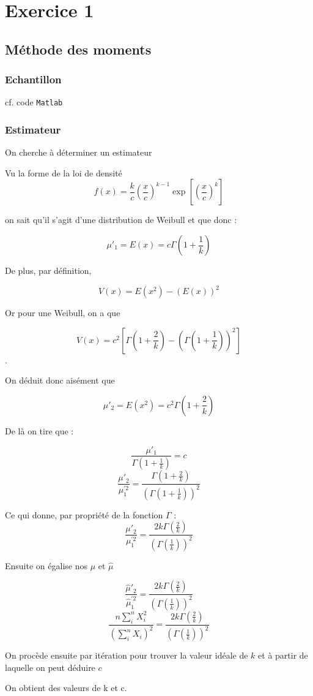 \section{Exercice 1 }

\subsection{Méthode des moments}

\subsubsection{Echantillon}
cf. code \texttt{Matlab}

\subsubsection{Estimateur}

On cherche à déterminer un estimateur 

Vu la forme de la loi de densité 
$$f(x) = \frac{k}{c} (\frac{x}{c})^{k-1} \exp[(\frac{x}{c})^{k}]$$

on sait qu'il s'agit d'une distribution de Weibull et que donc : 

$$ \mu'_1 = E(x) = c \Gamma(1+\frac{1}{k})$$

De plus, par définition, 

$$V(x) = E(x^2) - (E(x))^2$$

Or pour une Weibull, on a que 

$$V(x) = c^2 [\Gamma(1+\frac{2}{k}) - (\Gamma(1+\frac{1}{k}))^2]$$.

On déduit donc aisément que 

$$ \mu'_2 = E(x^2) = c^2 \Gamma(1+\frac{2}{k})  $$

De là on tire que : 

$$\frac{\mu'_1}{\Gamma(1+\frac{1}{k})} = c $$
$$\frac{\mu'_2}{\mu_{1}^{'2}} = \frac{\Gamma(1+\frac{2}{k})}{(\Gamma(1+\frac{1}{k}))^2}$$

Ce qui donne, par propriété de la fonction $\Gamma$ : 
$$\frac{\mu'_2}{\mu_{1}^{'2}} = \frac{2 k \Gamma(\frac{2}{k})}{(\Gamma(\frac{1}{k}))^2}$$ 

Ensuite on égalise nos $\mu$ et $\hat{\mu}$

$$\frac{\hat{\mu}'_2}{\hat{\mu}_{1}^{'2}} = \frac{2 k \Gamma(\frac{2}{k})}{(\Gamma(\frac{1}{k}))^2}$$ 
$$\frac{ n \sum_i^n X_i^2}{(\sum_i^{n} X_i)^2} = \frac{2 k \Gamma(\frac{2}{k})}{(\Gamma(\frac{1}{k}))^2}$$ 

On procède ensuite par itération pour trouver la valeur idéale de $k$ et à partir de laquelle on peut déduire $c$

On obtient des valeurs de k et c. 